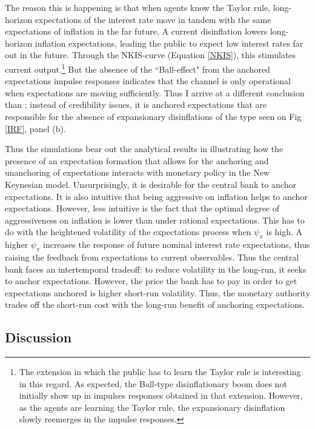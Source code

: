 \documentclass[11pt]{article}
\renewcommand{\[}{\begin{equation}}
\renewcommand{\]}{\end{equation}}
\begin{document}
The reason this is happening is that when agents know the Taylor rule, long-horizon expectations of the interest rate move in tandem with the same expectations of inflation in the far future. A current disinflation lowers long-horizon inflation expectations, leading the public to expect low interest rates far out in the future. Through the NKIS-curve (Equation \ref{NKIS}), this stimulates current output.\footnote{The extension in which the public has to learn the Taylor rule is interesting in this regard. As expected, the Ball-type disinflationary boom does not initially show up in impulses responses obtained in that extension. However, as the agents are learning the Taylor rule, the expansionary disinflation slowly reemerges in the impulse responses.} But the absence of the ``Ball-effect" from the anchored expectations impulse responses indicates that the channel is only operational when expectations are moving sufficiently. Thus I arrive at a different conclusion than \cite{ball1994credible}; instead of credibility issues, it is anchored expectations that are responsible for the absence of expansionary disinflations of the type seen on Fig \ref{IRF}, panel (b).

Thus the simulations bear out the analytical results in illustrating how the presence of an expectation formation that allows for the anchoring and unanchoring of expectations interacts with monetary policy in the New Keynesian model. Unsurprisingly, it is desirable for the central bank to anchor expectations. It is also intuitive that being aggressive on inflation helps to anchor expectations. However, less intuitive is the fact that the optimal degree of aggressiveness on inflation is lower than under rational expectations. This has to do with the heightened volatility of the expectations process when $\psi_{\pi}$ is high. A higher $\psi_{\pi}$ increases the response of future nominal interest rate expectations, thus raising the feedback from expectations to current observables. Thus the central bank faces an intertemporal tradeoff: to reduce volatility in the long-run, it seeks to anchor expectations. However, the price the bank has to pay in order to get expectations anchored is higher short-run volatility. Thus, the monetary authority trades off the short-run cost with the long-run benefit of anchoring expectations.

\subsection{Discussion}\label{discussion_results}
\end{document}
